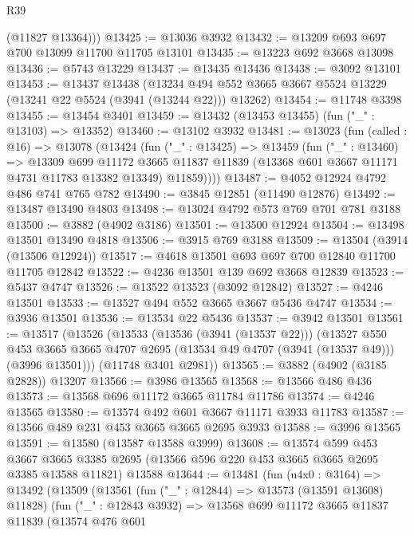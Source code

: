 \begin{lexlean}{R39}
\begin{coremodule}
        (@11827 @13364)))
@13425 := @13036 @3932
@13432 := @13209 @693 @697 @700 @13099 @11700 @11705 @13101
@13435 := @13223 @692 @3668 @13098
@13436 := @5743 @13229
@13437 := @13435 @13436
@13438 := @3092 @13101
@13453 := @13437
    @13438
    (@13234 @494 @552 @3665 @3667 @5524 @13229 (@13241 @22 @5524 (@3941 (@13244 @22))) @13262)
@13454 := @11748 @3398
@13455 := @13454 @3401
@13459 := @13432 (@13453 @13455) (fun ("_" : @13103) => @13352)
@13460 := @13102 @3932
@13481 := @13023
    (fun (called : @16) =>
    @13078
      (@13424
        (fun ("_" : @13425) =>
        @13459
          (fun ("_" : @13460) =>
          @13309
            @699
            @11172
            @3665
            @11837
            @11839
            (@13368 @601 @3667 @11171 @4731 @11783 @13382 @13349)
            @11859))))
@13487 := @4052 @12924 @4792 @486 @741 @765 @782
@13490 := @3845 @12851 (@11490 @12876)
@13492 := @13487 @13490 @4803
@13498 := @13024 @4792 @573 @769 @701 @781 @3188
@13500 := @3882 (@4902 @3186)
@13501 := @13500 @12924
@13504 := @13498 @13501 @13490 @4818
@13506 := @3915 @769 @3188
@13509 := @13504 (@3914 (@13506 @12924))
@13517 := @4618 @13501 @693 @697 @700 @12840 @11700 @11705 @12842
@13522 := @4236 @13501 @139 @692 @3668 @12839
@13523 := @5437 @4747
@13526 := @13522 @13523 (@3092 @12842)
@13527 := @4246 @13501
@13533 := @13527 @494 @552 @3665 @3667 @5436 @4747
@13534 := @3936 @13501
@13536 := @13534 @22 @5436
@13537 := @3942 @13501
@13561 := @13517
    (@13526
      (@13533
        (@13536 (@3941 (@13537 @22)))
        (@13527
          @550
          @453
          @3665
          @3665
          @4707
          @2695
          (@13534 @49 @4707 (@3941 (@13537 @49)))
          (@3996 @13501)))
      (@11748 @3401 @2981))
@13565 := @3882 (@4902 (@3185 @2828)) @13207
@13566 := @3986 @13565
@13568 := @13566 @486 @436
@13573 := @13568 @696 @11172 @3665 @11784 @11786
@13574 := @4246 @13565
@13580 := @13574 @492 @601 @3667 @11171 @3933 @11783
@13587 := @13566 @489 @231 @453 @3665 @3665 @2695 @3933
@13588 := @3996 @13565
@13591 := @13580 (@13587 @13588 @3999)
@13608 := @13574
    @599
    @453
    @3667
    @3665
    @3385
    @2695
    (@13566 @596 @220 @453 @3665 @3665 @2695 @3385 @13588 @11821)
    @13588
@13644 := @13481
    (fun (u4x0 : @3164) =>
    @13492
      (@13509
        (@13561
          (fun ("_" : @12844) => @13573 (@13591 @13608) @11828)
          (fun ("_" : @12843 @3932) =>
          @13568
            @699
            @11172
            @3665
            @11837
            @11839
            (@13574
              @476
              @601

\end{coremodule}
\end{lexlean}
